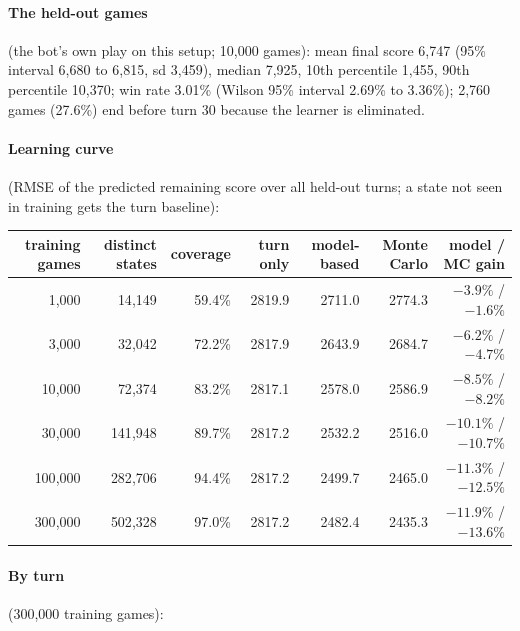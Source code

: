 \documentclass{../polyexp}
\begin{document}
\paragraph{The held-out games} (the bot's own play on this setup; 10{,}000 games): mean final score 6{,}747
(95\% interval 6{,}680 to 6{,}815, sd 3{,}459), median 7{,}925, 10th percentile 1{,}455, 90th percentile 10{,}370;
win rate 3.01\% (Wilson 95\% interval 2.69\% to 3.36\%); 2{,}760 games (27.6\%) end before turn 30 because the
learner is eliminated.

\paragraph{Learning curve} (RMSE of the predicted remaining score over all held-out turns; a state not seen in
training gets the turn baseline):

\begin{center}\small
\begin{tabular}{rrrrrrr}
\toprule
training games & distinct states & coverage & turn only & model-based & Monte Carlo & model / MC gain \\
\midrule
1{,}000   & 14{,}149  & 59.4\% & 2819.9 & 2711.0 & 2774.3 & $-3.9\%$ / $-1.6\%$ \\
3{,}000   & 32{,}042  & 72.2\% & 2817.9 & 2643.9 & 2684.7 & $-6.2\%$ / $-4.7\%$ \\
10{,}000  & 72{,}374  & 83.2\% & 2817.1 & 2578.0 & 2586.9 & $-8.5\%$ / $-8.2\%$ \\
30{,}000  & 141{,}948 & 89.7\% & 2817.2 & 2532.2 & 2516.0 & $-10.1\%$ / $-10.7\%$ \\
100{,}000 & 282{,}706 & 94.4\% & 2817.2 & 2499.7 & 2465.0 & $-11.3\%$ / $-12.5\%$ \\
300{,}000 & 502{,}328 & 97.0\% & 2817.2 & 2482.4 & 2435.3 & $-11.9\%$ / $-13.6\%$ \\
\bottomrule
\end{tabular}
\end{center}

\paragraph{By turn} (300{,}000 training games):
\end{document}
